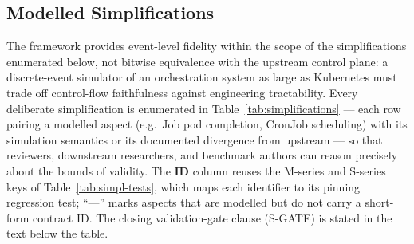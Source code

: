 \documentclass[ASNA,twocolumn]{USG}
\begin{document}
    \subsection{Modelled Simplifications}\label{sec:simplifications}

    The framework provides event-level fidelity within the scope of the
    simplifications enumerated below, not bitwise equivalence with the
    upstream control plane: a discrete-event simulator of an
    orchestration system as large as Kubernetes must trade off
    control-flow faithfulness against engineering tractability. Every
    deliberate simplification is enumerated in
    Table~\ref{tab:simplifications} --- each row pairing a modelled aspect
    (e.g.\ Job pod completion, CronJob scheduling) with its simulation
    semantics or its documented divergence from upstream --- so that
    reviewers, downstream researchers, and benchmark authors can reason
    precisely about the bounds of validity. The \textbf{ID} column reuses
    the M-series and S-series keys of Table~\ref{tab:simpl-tests}, which
    maps each identifier to its pinning regression test; ``---'' marks
    aspects that are modelled but do not carry a short-form contract ID.
    The closing validation-gate clause (S-GATE) is stated in the text
    below the table.
\end{document}
